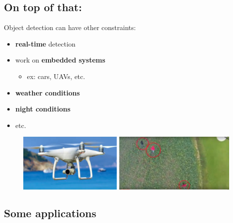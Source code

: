 \documentclass{beamer}[10pt, usepdftitle=false, handout]
\begin{document}
    \subsection{On top of that:}
	    
	\begin{frame}
	
	Object detection can have other constraints:	
	\vspace*{1em}	
	
	\begin{itemize}
		\item{\textbf{real-time} detection}
		\item{work on \textbf{embedded systems}
		\begin{itemize}
			\item{ex: cars, UAVs, etc.}
		\end{itemize}				
		}
		\item{\textbf{weather conditions}}
		\item{\textbf{night conditions}}
		\item{etc.}
	\end{itemize}
	
	\begin{figure}
		\includegraphics[scale=0.9]{2m.png} 
	\end{figure}

    \end{frame}	    
	    
	\subsection{Some applications}	
	    
\end{document}
